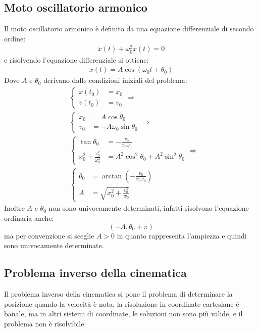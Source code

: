 \documentclass[11pt, a4paper, openright]{book}
\theoremstyle{plain}
\theoremstyle{definition}
\begin{document}
\subsection{Moto oscillatorio armonico}
Il moto oscillatorio armonico è definito da una equazione differenziale di secondo ordine:
\begin{align}
    \ddot{x}(t) + \omega_0^2x(t) = 0
\end{align}
e risolvendo l'equazione differenziale si ottiene:
\begin{align}
    x(t) = A\cos(\omega_0t + \theta_0)
\end{align}
Dove $A$ e $\theta_0$ derivano dalle condizioni iniziali del problema:
\begin{align} &
    \begin{cases}
        x(t_0) & = x_0 \\
        v(t_0) & = v_0
    \end{cases} \Rightarrow \\ &
    \begin{cases}
        x_0 & = A\cos\theta_0 \\
        v_0 & = -A\omega_0\sin\theta_0
    \end{cases} \Rightarrow \\ &
    \begin{cases}
        \tan\theta_0 & = -\frac{v_0}{x_0\omega_0} \\
        x_0^2 + \frac{v_0^2}{\omega_0^2} & = A^2\cos^2\theta_0 + A^2\sin^2\theta_0
    \end{cases} \Rightarrow  \\ &
    \begin{cases}
        \displaystyle \theta_0 & = \arctan(-\frac{v_0}{x_0\omega_0}) \\
        \displaystyle A & = \sqrt{x_0^2 + \frac{v_0^2}{w_0}}
    \end{cases}
\end{align}
Inoltre $A$ e $\theta_0$ non sono univocamente determinati, infatti risolvono l'equazione ordinaria anche:
\[(-A, \theta_0 + \pi)\]
ma per convenzione si sceglie $A > 0$ in quanto rappresenta l'ampiezza e quindi sono univocamente determinate.

\newpage

\subsection{Problema inverso della cinematica}
Il problema inverso della cinematica si pone il problema di determinare la posizione quando la velocità è nota, la risoluzione in coordinate cartesiane è banale, ma in altri sistemi di coordinate, le soluzioni non sono più valide, e il problema non è risolvibile:
\end{document}
